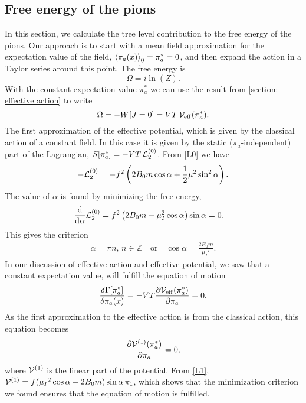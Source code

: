 \subsection{Free energy of the pions}
In this section, we calculate the tree level contribution to the free energy of the pions.
Our approach is to start with a mean field approximation for the expectation value of the field, $\ex{\pi_a(x)}_0 = \pi^*_a = 0$, and then expand the action in a Taylor series around this point.
The free energy is 
\begin{equation}
    \Omega = i \ln(Z).
\end{equation}
With the constant expectation value $\pi^*_a$ we can use the result from \autoref{section: effective action} to write
\begin{equation}
    \Omega = -W[J=0] = V T \, \mathcal{V}_{\mathrm{eff}}(\pi^*_a).
\end{equation}
The first approximation of the effective potential, which is given by the classical action of a constant field.
In this case it is given by the static ($\pi_a$-independent) part of the Lagrangian, $S[\pi^*_a] = -V T \, \mathcal{L}_2^{(0)}$.
From \autoref{L0} we have
\begin{equation}
    - \mathcal{L}_2^{(0)} = 
    -f^2   
    \left(
        2B_0m \cos{\alpha}
        + \frac{1}{2} \mu^2 \sin^2{\alpha}
    \right).
\end{equation}
The value of $\alpha$ is found by minimizing the free energy,
\begin{align*}
    &\dv{\alpha} \mathcal{L}_2^{(0)} 
    = f^2\left(2B_0m - \mu_I^2\cos{\alpha}\right)\sin{\alpha}
    = 0.
\end{align*}
This gives the criterion
\begin{align}
    \alpha = \pi n, \, n \in \mathbb{Z} \quad
    \mathrm{or} \quad
    \cos{\alpha} = \frac{2B_0m}{\mu_I{}^2}.
\end{align}
In our discussion of effective action and effective potential, we saw that a constant expectation value, will fulfill the equation of motion
\begin{equation}
    \frac{\delta \Gamma[\pi^*_a]}{\delta \pi_a(x)}
    = - V T \pdv{\mathcal{V}_{\mathrm{eff}}(\pi^*_a)}{\pi_a} = 0.
\end{equation}
As the first approximation to the effective action is from the classical action, this equation becomes
\begin{equation}
    \pdv{\mathcal{V}^{(1)}(\pi^*_a)}{\pi_a} = 0,
\end{equation}
where $\mathcal{V}^{(1)}$ is the linear part of the potential. 
From \autoref{L1}, $\mathcal{V}^{(1)} = f(\mu_I{}^2\cos{\alpha} - 2B_0m)\sin{\alpha} \, \pi_1 $, which shows that the minimization criterion we found ensures that the equation of motion is fulfilled.

